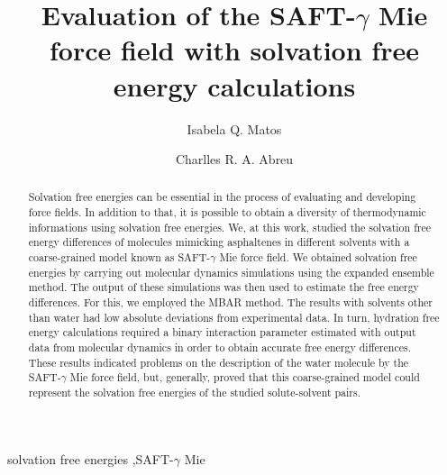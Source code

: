 \documentclass[final,12p,times,twocolumn]{elsarticle}
\begin{document}
	
	\begin{frontmatter}
		
		\title{Evaluation of the SAFT-$\gamma$ Mie force field with solvation free energy calculations}%
		
		\author{Isabela Q. Matos}
		\author{Charlles R. A. Abreu }
		\address{Chemical Engineering Department, Escola de Qu\'{\i}mica, Universidade Federal do Rio de Janeiro, Av. Athos da Silveira Ramos 149, Rio de Janeiro, RJ 21941-909, Brazil}
	
		
		\begin{abstract}
   Solvation free energies can be essential in the process of evaluating and developing force fields. In addition to that, it is possible to obtain a diversity of thermodynamic informations using solvation free energies. We, at this work, studied the solvation free energy differences of molecules mimicking asphaltenes in different solvents with a coarse-grained model known as SAFT-$\gamma$ Mie force field. We obtained solvation free energies  by carrying out molecular dynamics simulations using the expanded ensemble method. The output of these simulations was then used to estimate the free energy differences. For this, we employed the MBAR method. The results with solvents other than water had low absolute deviations from experimental data. In turn, hydration free energy calculations required a binary interaction parameter estimated with output data from molecular dynamics in order to obtain accurate free energy differences. These results indicated problems on the description of the water molecule by the SAFT-$\gamma$ Mie force field, but, generally, proved that this coarse-grained model could represent the solvation free energies of the studied solute-solvent pairs.
		\end{abstract}
		
		\begin{keyword}
			solvation free energies \sep SAFT-$\gamma$ Mie 
		\end{keyword}
		
	\end{frontmatter}

\end{document}
